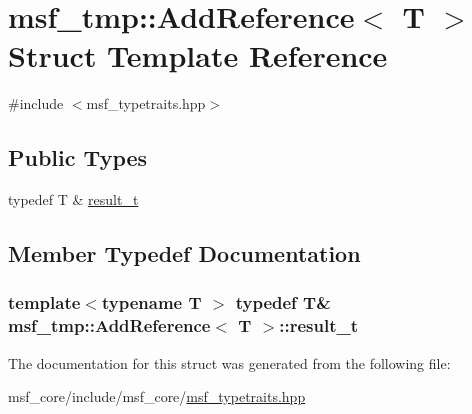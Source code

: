 \hypertarget{structmsf__tmp_1_1AddReference}{\section{msf\-\_\-tmp\-:\-:Add\-Reference$<$ T $>$ Struct Template Reference}
\label{structmsf__tmp_1_1AddReference}
}


{\ttfamily \#include $<$msf\-\_\-typetraits.\-hpp$>$}

\subsection*{Public Types}
\begin{DoxyCompactItemize}
\item 
typedef T \& \hyperlink{structmsf__tmp_1_1AddReference_a85b751fb4f4b21b74497dbf84d29092a}{result\-\_\-t}
\end{DoxyCompactItemize}


\subsection{Member Typedef Documentation}
\hypertarget{structmsf__tmp_1_1AddReference_a85b751fb4f4b21b74497dbf84d29092a}{
\subsubsection[{result\-\_\-t}]{\setlength{\rightskip}{0pt plus 5cm}template$<$typename T $>$ typedef T\& {\bf msf\-\_\-tmp\-::\-Add\-Reference}$<$ T $>$\-::{\bf result\-\_\-t}}}\label{structmsf__tmp_1_1AddReference_a85b751fb4f4b21b74497dbf84d29092a}


The documentation for this struct was generated from the following file\-:\begin{DoxyCompactItemize}
\item 
msf\-\_\-core/include/msf\-\_\-core/\hyperlink{msf__typetraits_8hpp}{msf\-\_\-typetraits.\-hpp}\end{DoxyCompactItemize}
